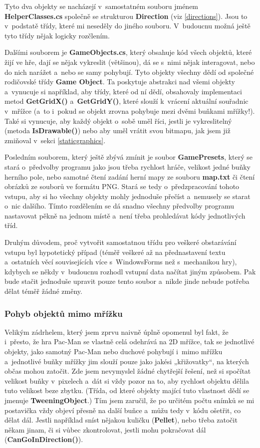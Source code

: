 \documentclass[a4]{article}
\begin{document}
Tyto dva objekty se nacházejí v~samostatném souboru jménem \textbf{HelperClasses.cs} společně se strukturou \textbf{Direction} (viz \ref{directions}). Jsou to v~podstatě třídy, které mi neseděly do jiného souboru. V~budoucnu možná ještě tyto třídy nějak logicky rozčlením. 

Dalšími souborem je \textbf{GameObjects.cs}, který obsahuje kód všech objektů, které žijí ve hře, dají se nějak vykreslit (většinou), dá se s~nimi nějak interagovat, nebo do nich narážet a~nebo se samy pohybují. Tyto objekty všechny dědí od společné rodičovské třídy \textbf{Game Object}. Ta poskytuje abstrakci nad všemi objekty a~vynucuje si například, aby třídy, které od ní dědí, obsahovaly implementaci metod \textbf{GetGridX()} a~\textbf{GetGridY()}, které slouží k~vrácení aktuální souřadnic v~mřížce (a~to i~pokud se objekt zrovna pohybuje mezi dvěmi buňkami mřížky!). Také si vynucuje, aby každý objekt o~sobě uměl říci, jestli je vykreslitelný (metoda \textbf{IsDrawable()}) nebo aby uměl vrátit svou bitmapu, jak jsem již zmiňoval v~sekci \ref{staticgraphics}.

Posledním souborem, který ještě zbývá zmínit je soubor \textbf{GamePresets}, který se stará o~předvolby programu jako jsou třeba rychlost hráče, velikost jedné buňky herního pole, nebo samotné čtení zadání herní mapy ze souboru \textbf{map.txt} či čtení obrázků ze souborů ve formátu PNG. Stará se tedy o~předzpracování tohoto vstupu, aby si ho všechny objekty mohly jednoduše přečíst a~nemusely se starat o~nic dalšího. Tímto rozdělením se dá snadno všechny předvolby programu nastavovat pěkně na jednom místě a~není třeba prohledávat kódy jednotlivých tříd.

Druhým důvodem, proč vytvořit samostatnou třídu pro veškeré obstarávání vstupu byl hypotetický případ (téměř veškeré až na přednastavení textu a~ostatních věcí souvisejících více s~WindowsForms než s~mechanikou hry), kdybych se někdy v~budoucnu rozhodl vstupní data načítat jiným způsobem. Pak bude stačit jednoduše upravit pouze tento soubor a~nikde jinde nebude potřeba dělat téměř žádné změny.

\subsubsection{Pohyb objektů mimo mřížku} \label{tweening}
Velikým zádrhelem, který jsem zprvu naivně úplně opomenul byl fakt, že i~přesto, že hra Pac-Man se vlastně celá odehrává na 2D mřížce, tak se jednotlivé objekty, jako samotný Pac-Man nebo duchové pohybují i~mimo mřížku a~jednotlivé buňky mřížky jim slouží pouze jako jakési „křižovatky“, na kterých občas mohou zatočit. Zde jsem nevymyslel žádné chytřejší řešení, než si spočítat velikost buňky v~pixelech a~dát si vždy pozor na to, aby rychlost objektu dělila tuto velikost beze zbytku. (Třída, od které objekty mající tuto vlastnost dědí se jmenuje \textbf{TweeningObject}.) Tím jsem zaručil, že po určitém počtu snímků se mi postavička vždy objeví přesně na další buňce a~můžu tedy v~kódu ošetřit, co dělat dál. Jestli například sníst nějakou kuličku (\textbf{Pellet}), nebo třeba zatočit někam jinam, či si vůbec zkontrolovat, jestli mohu pokračovat dál (\textbf{CanGoInDirection()}).
\end{document}
